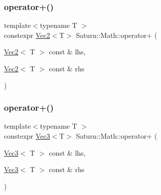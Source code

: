 \subsubsection{\texorpdfstring{operator+()}{operator+()}\hspace{0.1cm}{\footnotesize\ttfamily [2/4]}}
{\footnotesize\ttfamily template$<$typename T $>$ \\
constexpr \mbox{\hyperlink{namespace_saturn_1_1_math_a8befc95aeff660bda92b8807c1cc5224}{Vec2}}$<$T$>$ Saturn\+::\+Math\+::operator+ (\begin{DoxyParamCaption}\item[{\mbox{\hyperlink{namespace_saturn_1_1_math_a8befc95aeff660bda92b8807c1cc5224}{Vec2}}$<$ T $>$ const \&}]{lhs,  }\item[{\mbox{\hyperlink{namespace_saturn_1_1_math_a8befc95aeff660bda92b8807c1cc5224}{Vec2}}$<$ T $>$ const \&}]{rhs }\end{DoxyParamCaption})}

\mbox{\label{namespace_saturn_1_1_math_ad648c543657af1553c06c2870c57904d}} 
\subsubsection{\texorpdfstring{operator+()}{operator+()}\hspace{0.1cm}{\footnotesize\ttfamily [3/4]}}
{\footnotesize\ttfamily template$<$typename T $>$ \\
constexpr \mbox{\hyperlink{namespace_saturn_1_1_math_af4a7a893730c64ac02b620f648cc5406}{Vec3}}$<$T$>$ Saturn\+::\+Math\+::operator+ (\begin{DoxyParamCaption}\item[{\mbox{\hyperlink{namespace_saturn_1_1_math_af4a7a893730c64ac02b620f648cc5406}{Vec3}}$<$ T $>$ const \&}]{lhs,  }\item[{\mbox{\hyperlink{namespace_saturn_1_1_math_af4a7a893730c64ac02b620f648cc5406}{Vec3}}$<$ T $>$ const \&}]{rhs }\end{DoxyParamCaption})}

\mbox{\label{namespace_saturn_1_1_math_afbaf057a9ff3c0e9c4f6a5397e157c88}} 
